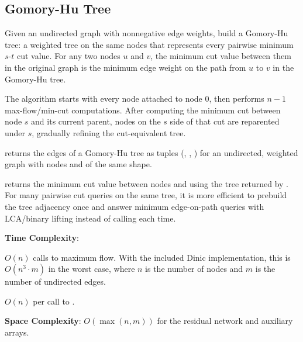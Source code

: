 \subsection{Gomory-Hu Tree}
\label{sec:4.5.8}
Given an undirected graph with nonnegative edge weights, build a Gomory-Hu tree: a weighted tree on the same nodes that represents every pairwise minimum $s$-$t$ cut value. For any two nodes $u$ and $v$, the minimum cut value between them in the original graph is the minimum edge weight on the path from $u$ to $v$ in the Gomory-Hu tree.

The algorithm starts with every node attached to node $0$, then performs $n - 1$ max-flow/min-cut computations. After computing the minimum cut between node $s$ and its current parent, nodes on the $s$ side of that cut are reparented under $s$, gradually refining the cut-equivalent tree.

\begin{compactitem}
  \item {} returns the  edges of a Gomory-Hu tree as tuples (, , ) for an undirected, weighted graph with  nodes and  of the same shape.
  \item {} returns the minimum cut value between nodes  and  using the tree returned by . For many pairwise cut queries on the same tree, it is more efficient to prebuild the tree adjacency once and answer minimum edge-on-path queries with LCA/binary lifting instead of calling  each time.
\end{compactitem}

\textbf{Time Complexity}:
\begin{compactitem}
  \item $O(n)$ calls to maximum flow. With the included Dinic implementation, this is $O(n^{3} \cdot m)$ in the worst case, where $n$ is the number of nodes and $m$ is the number of undirected edges.
  \item $O(n)$ per call to .
\end{compactitem}

\textbf{Space Complexity}: $O(\max\left(n, m\right))$ for the residual network and auxiliary arrays.

